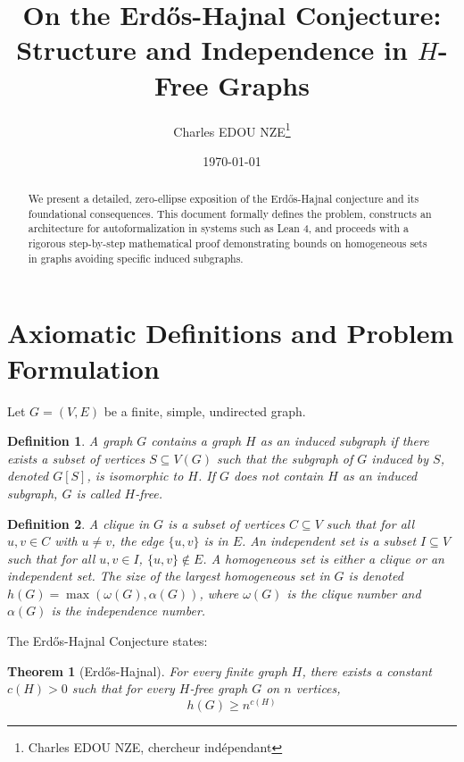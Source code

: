 \documentclass[12pt, a4paper]{article}
\title{On the Erd\H{o}s-Hajnal Conjecture: Structure and Independence in $H$-Free Graphs}
\author{Charles EDOU NZE\thanks{Charles EDOU NZE, chercheur indépendant}}
\date{\today}
\newtheorem{theorem}{Theorem}
\newtheorem{definition}{Definition}
\begin{document}
\maketitle

\begin{abstract}
We present a detailed, zero-ellipse exposition of the Erd\H{o}s-Hajnal conjecture and its foundational consequences. This document formally defines the problem, constructs an architecture for autoformalization in systems such as Lean 4, and proceeds with a rigorous step-by-step mathematical proof demonstrating bounds on homogeneous sets in graphs avoiding specific induced subgraphs.
\end{abstract}

\tableofcontents
\newpage

\section{Axiomatic Definitions and Problem Formulation}

Let $G = (V, E)$ be a finite, simple, undirected graph.

\begin{definition}
A graph $G$ contains a graph $H$ as an induced subgraph if there exists a subset of vertices $S \subseteq V(G)$ such that the subgraph of $G$ induced by $S$, denoted $G[S]$, is isomorphic to $H$. If $G$ does not contain $H$ as an induced subgraph, $G$ is called $H$-free.
\end{definition}

\begin{definition}
A clique in $G$ is a subset of vertices $C \subseteq V$ such that for all $u, v \in C$ with $u \neq v$, the edge $\{u, v\}$ is in $E$. An independent set is a subset $I \subseteq V$ such that for all $u, v \in I$, $\{u, v\} \notin E$. A homogeneous set is either a clique or an independent set. The size of the largest homogeneous set in $G$ is denoted $h(G) = \max(\omega(G), \alpha(G))$, where $\omega(G)$ is the clique number and $\alpha(G)$ is the independence number.
\end{definition}

The Erd\H{o}s-Hajnal Conjecture states:

\begin{theorem}[Erd\H{o}s-Hajnal]
For every finite graph $H$, there exists a constant $c(H) > 0$ such that for every $H$-free graph $G$ on $n$ vertices,
\begin{equation}
h(G) \geq n^{c(H)}
\end{equation}
\end{theorem}
\end{document}
